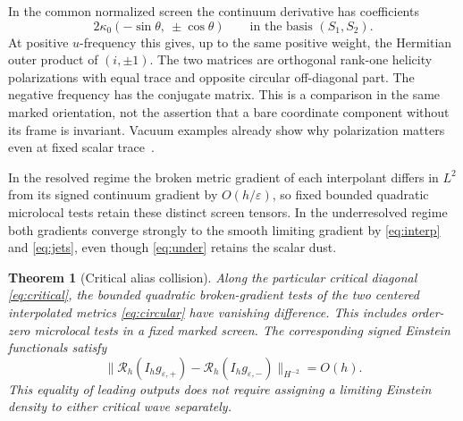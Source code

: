 \documentclass[11pt]{article}
\newtheorem{theorem}{Theorem}
\newcommand{\Rcal}{\mathcal R}
\begin{document}
In the common normalized screen the continuum derivative
has coefficients
\[
       2\kappa_0(-\sin\theta,\ \pm\cos\theta)
       \qquad\text{in the basis }(S_1,S_2).
\]
At positive \(u\)-frequency this gives, up to the same
positive weight, the Hermitian outer product of
\((i,\pm1)\). The two matrices are orthogonal rank-one
helicity polarizations with equal trace and opposite
circular off-diagonal part. The negative frequency has the
conjugate matrix. This is a comparison in the same marked
orientation, not the assertion that a bare coordinate
component without its frame is invariant. Vacuum examples already show why
polarization matters even at fixed scalar trace~\cite{VacuumPolarization}.

In the resolved regime the broken metric gradient of each
interpolant differs in \(L^2\) from its signed continuum gradient
by \(O(h/\varepsilon)\), so fixed bounded quadratic microlocal
tests retain these distinct screen tensors. In the underresolved
regime both gradients converge strongly to the smooth limiting
gradient by \eqref{eq:interp} and \eqref{eq:jets}, even though
\eqref{eq:under} retains the scalar dust.

\begin{theorem}[Critical alias collision]\label{thm:circular}
Along the particular critical diagonal \eqref{eq:critical},
the bounded quadratic broken-gradient tests of the two centered
interpolated metrics \eqref{eq:circular} have vanishing difference.
This includes order-zero microlocal tests in a fixed marked
screen. The corresponding signed Einstein functionals satisfy
\[
 \|\Rcal_h(I_hg_{\varepsilon,+})
          -\Rcal_h(I_hg_{\varepsilon,-})\|_{H^{-2}}=O(h).
\]
This equality of leading outputs does not require assigning
a limiting Einstein density to either critical wave separately.
\end{theorem}
\end{document}
